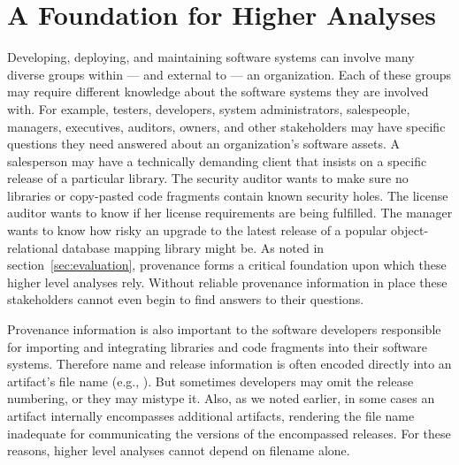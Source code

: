 \section{A Foundation for Higher Analyses}

Developing, deploying, and maintaining software systems can involve many
diverse groups within --- and external to --- an organization.  Each of these
groups may require different knowledge about the software systems they are
involved with.  For example, testers, developers, system administrators,
salespeople, managers, executives, auditors, owners, and other stakeholders
may have specific questions they need answered about an organization's
software assets.  A salesperson may have a technically demanding client
that insists on a specific release of a particular library.  The security
auditor wants to make sure no libraries or copy-pasted code fragments
contain known security holes.  The license auditor wants to know if her
license requirements are being fulfilled.  The manager wants to know how
risky an upgrade to the latest release of a popular object-relational
database mapping library might be.  As noted in
section~\ref{sec:evaluation}, provenance forms a critical foundation upon
which these higher level analyses rely.  Without reliable provenance
information in place these stakeholders cannot even begin to find answers
to their questions.


Provenance information is also important to the software developers
responsible for importing and integrating libraries and code fragments into
their software systems.  Therefore name and release information is often
encoded directly into an artifact's file name (e.g., ).
But sometimes developers may omit the release numbering, or they may
mistype it.  Also, as we noted earlier, in some cases an artifact
internally encompasses additional artifacts, rendering the file name
inadequate for communicating the versions of the encompassed releases.  For
these reasons, higher level analyses cannot depend on filename alone.

